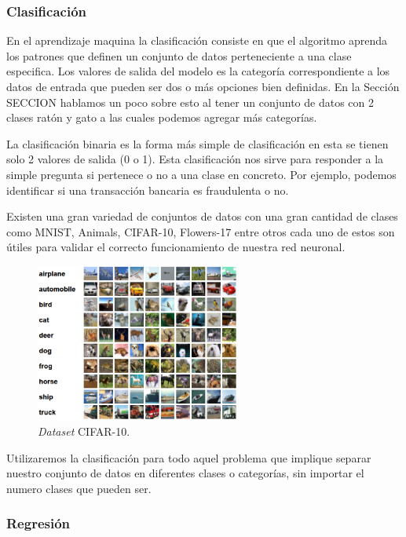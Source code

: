 \subsubsection{Clasificación}

En el aprendizaje maquina la clasificación consiste en que el algoritmo aprenda los patrones que definen un conjunto de datos perteneciente a una clase especifica. Los valores de salida del modelo es la categoría correspondiente a los datos de entrada que pueden ser dos o más opciones bien definidas. En la Sección SECCION hablamos un poco sobre esto al tener un conjunto de datos con 2 clases ratón y gato a las cuales podemos agregar más categorías.

La clasificación binaria es la forma más simple de clasificación en esta se tienen solo 2 valores de salida (0 o 1). Esta clasificación nos sirve para responder a la simple pregunta si pertenece o no a una clase en concreto. Por ejemplo, podemos identificar si una transacción bancaria es fraudulenta o no.

Existen una gran variedad de conjuntos de datos con una gran cantidad de clases como MNIST, Animals, CIFAR-10, Flowers-17 entre otros cada uno de estos son útiles para validar el correcto funcionamiento de nuestra red neuronal.

\begin{figure}[H]
    \centering
    \includegraphics[width=0.6\textwidth]{MarcoTeorico/imgs/CIFAR-10.png}
    \caption{\textit{Dataset} CIFAR-10.}
    \label{fig:cifar10}
\end{figure}

Utilizaremos la clasificación para todo aquel problema que implique separar nuestro conjunto de datos en diferentes clases o categorías, sin importar el numero clases que pueden ser.

\subsubsection{Regresión}

